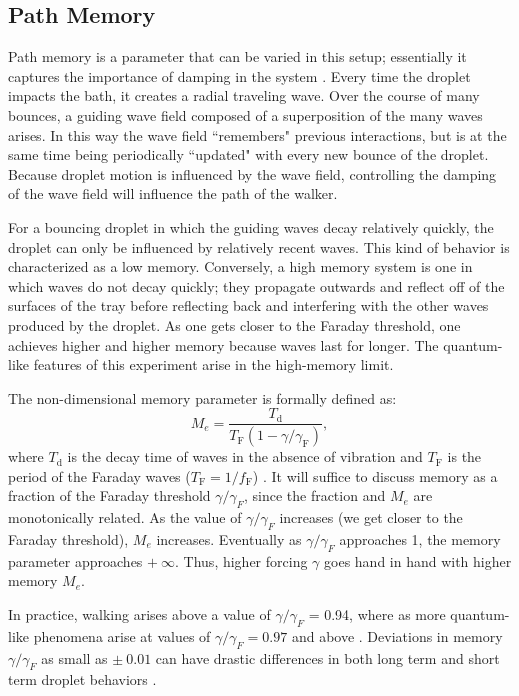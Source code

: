  
            \subsection{Path Memory}
                        
            Path memory is a parameter that can be varied in this setup; essentially it captures the importance of damping in the system . Every time the droplet impacts the bath, it creates a radial traveling wave. Over the course of many bounces, a guiding wave field composed of a superposition of the many waves arises. In this way the wave field ``remembers" previous interactions, but is at the same time being periodically ``updated" with every new bounce of the droplet. Because droplet motion is influenced by the wave field, controlling the damping of the wave field will influence the path of the walker. 
            
For a bouncing droplet in which the guiding waves decay relatively quickly, the droplet can only be influenced by relatively recent waves. This kind of behavior is characterized as a low memory. Conversely, a high memory system is one in which waves do not decay quickly; they propagate outwards and reflect off of the surfaces of the tray before reflecting back and interfering with the other waves produced by the droplet. As one gets closer to the Faraday threshold, one achieves higher and higher memory because waves last for longer. The quantum-like features of this experiment arise in the high-memory limit. 

The non-dimensional memory parameter is formally defined as:
$$M_e = \frac{T_\mathrm{d}}{T_\mathrm{F}(1-\gamma/\gamma_\mathrm{F})},$$
where $T_\mathrm{d}$ is the decay time of waves in the absence of vibration and $T_\mathrm{F}$ is the period of the Faraday waves ($T_\mathrm{F} = 1/f_\mathrm{F}$) . It will suffice to discuss memory as a fraction of the Faraday threshold $\gamma/\gamma_{F}$, since the fraction and $M_e$ are monotonically related. As the value of $\gamma/\gamma_{F}$ increases (we get closer to the Faraday threshold), $M_e$ increases. Eventually as $\gamma/\gamma_{F}$ approaches 1, the memory parameter approaches $+~\infty$. Thus, higher forcing $\gamma$ goes hand in hand with higher memory $M_e$. 

In practice, walking arises above a value of $\gamma/\gamma_{F}$ = 0.94, where as more quantum-like phenomena arise at values of $\gamma/\gamma_{F} = 0.97$ and above . Deviations in memory $\gamma/\gamma_{F}$ as small as $\pm~0.01$ can have drastic differences in both long term and short term droplet behaviors .
            
